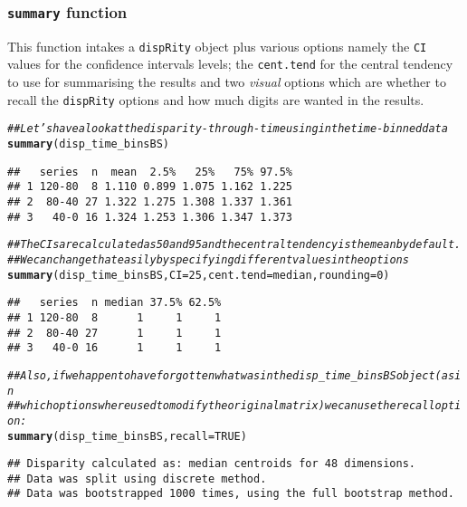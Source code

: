 \documentclass{article}\usepackage[]{graphicx}\usepackage[]{color}
\makeatletter
\newcommand{\hlnum}[1]{\textcolor[rgb]{0.686,0.059,0.569}{#1}}%
\newcommand{\hlcom}[1]{\textcolor[rgb]{0.678,0.584,0.686}{\textit{#1}}}%
\newcommand{\hlstd}[1]{\textcolor[rgb]{0.345,0.345,0.345}{#1}}%
\newcommand{\hlkwc}[1]{\textcolor[rgb]{0.333,0.667,0.333}{#1}}%
\newcommand{\hlkwd}[1]{\textcolor[rgb]{0.737,0.353,0.396}{\textbf{#1}}}%
\newenvironment{kframe}{%
 \def\at@end@of@kframe{}%
 \ifinner\ifhmode%
  \def\at@end@of@kframe{\end{minipage}}%
  \begin{minipage}{\columnwidth}%
 \fi\fi%
 \def\FrameCommand##1{\hskip\@totalleftmargin \hskip-\fboxsep
 \colorbox{shadecolor}{##1}\hskip-\fboxsep
     \hskip-\linewidth \hskip-\@totalleftmargin \hskip\columnwidth}%
 \MakeFramed {\advance\hsize-\width
   \@totalleftmargin\z@ \linewidth\hsize
   \@setminipage}}%
 {\par\unskip\endMakeFramed%
 \at@end@of@kframe}
\newenvironment{knitrout}{}{} %
\newcommand{\dispRity}{\texttt{dispRity} }
\makeatother
\begin{document}
\subsubsection{\texttt{summary} function}
This function intakes a \dispRity object plus various options namely the \texttt{CI} values for the confidence intervals levels; the \texttt{cent.tend} for the central tendency to use for summarising the results and two \textit{visual} options which are whether to recall the \dispRity options and how much digits are wanted in the results.

\begin{knitrout}
\color{fgcolor}\begin{kframe}
\begin{alltt}
\hlcom{## Let's have a look at the disparity-through-time using in the time-binned data}
\hlkwd{summary}\hlstd{(disp_time_binsBS)}
\end{alltt}
\begin{verbatim}
##   series  n  mean  2.5%   25%   75% 97.5%
## 1 120-80  8 1.110 0.899 1.075 1.162 1.225
## 2  80-40 27 1.322 1.275 1.308 1.337 1.361
## 3   40-0 16 1.324 1.253 1.306 1.347 1.373
\end{verbatim}
\begin{alltt}
\hlcom{## The CIs are calculated as 50 and 95 and the central tendency is the mean by default.}
\hlcom{## We can change that easily by specifying different values in the options}
\hlkwd{summary}\hlstd{(disp_time_binsBS,} \hlkwc{CI} \hlstd{=} \hlnum{25}\hlstd{,} \hlkwc{cent.tend} \hlstd{= median,} \hlkwc{rounding} \hlstd{=} \hlnum{0}\hlstd{)}
\end{alltt}
\begin{verbatim}
##   series  n median 37.5% 62.5%
## 1 120-80  8      1     1     1
## 2  80-40 27      1     1     1
## 3   40-0 16      1     1     1
\end{verbatim}
\begin{alltt}
\hlcom{## Also, if we happen to have forgotten what was in the disp_time_binsBS object (as in}
\hlcom{## which options where used to modify the original matrix) we can use the recall option:}
\hlkwd{summary}\hlstd{(disp_time_binsBS,} \hlkwc{recall} \hlstd{=} \hlnum{TRUE}\hlstd{)}
\end{alltt}
\begin{verbatim}
## Disparity calculated as: median centroids for 48 dimensions.
## Data was split using discrete method.
## Data was bootstrapped 1000 times, using the full bootstrap method.

\end{verbatim}
\end{kframe}
\end{knitrout}
\end{document}
